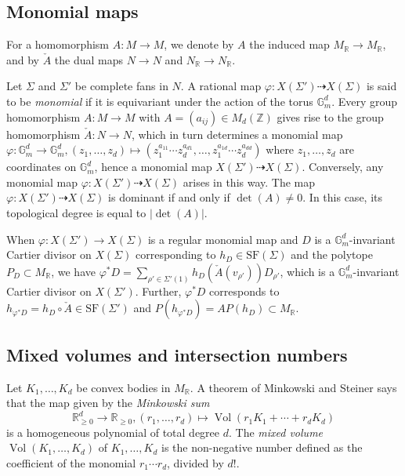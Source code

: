 \documentclass[11pt,a4paper]{article}
\theoremstyle{plain}
\theoremstyle{remark}
\theoremstyle{custombold}
\DeclareMathOperator{\vol}{Vol}
\begin{document}
\subsection{Monomial maps}

 For a homomorphism $A\colon M\rightarrow M$, we denote by $A$ the induced map $M_\mathbb R\rightarrow M_\mathbb R$, and by $\check{A}$ the dual maps $N\rightarrow N$ and $N_\mathbb R\rightarrow N_\mathbb R$.
 
Let $\Sigma$ and $\Sigma'$ be complete fans in $N$. A rational map $\varphi\colon X(\Sigma')\dashrightarrow X(\Sigma)$ is said to be  \emph{monomial} if it is equivariant under the action of the torus $\mathbb G_m^d$. Every group homomorphism $A\colon M\rightarrow M$ with $A=(a_{ij})\in M_d(\mathbb Z)$ gives rise to the group homomorphism $\check{A}\colon N\rightarrow N$, which in turn determines a monomial map
$\varphi\colon\mathbb G_m^d\rightarrow \mathbb G_m^d,(z_1,\ldots,z_d)\mapsto(z_1^{a_{11}}\cdots z_d^{a_{d1}},\ldots,z_1^{a_{1d}}\cdots z_d^{a_{dd}})$
where $z_1,\ldots,z_d$ are coordinates on $\mathbb G_m^d$, hence a monomial map $X(\Sigma')\dashrightarrow X(\Sigma)$. Conversely, any monomial map $\varphi\colon X(\Sigma')\dashrightarrow X(\Sigma)$ arises in this way. The map $\varphi\colon X(\Sigma')\dashrightarrow  X(\Sigma)$ is dominant if and only if  $\det(A)\neq0.$ In this case, its topological degree is equal to $|\det(A)|$. 

 
 When $\varphi\colon X(\Sigma') \rightarrow X(\Sigma)$ is a regular monomial map and $D$ is a $\mathbb G_m^d$-invariant Cartier divisor on $X(\Sigma)$ corresponding to $h_D\in \mathrm{SF}(\Sigma)$ and the polytope $P_D\subset M_\mathbb R$, we have $\varphi^*D=\sum_{\rho'\in\Sigma'(1)}h_D(\check{A}(v_{\rho'}))D_{\rho'}$, which is a $\mathbb G_m^d$-invariant Cartier divisor on $X(\Sigma')$. Further, $\varphi^*D$ corresponds to $h_{\varphi^*D}=h_D\circ \check{A}\in\mathrm{SF}(\Sigma')$ and $P(h_{\varphi^*D})=AP(h_D)\subset M_\mathbb R$.


\subsection{Mixed volumes and intersection numbers}


Let $K_1,\ldots,K_d$ be convex bodies in $M_\mathbb R$. A theorem of Minkowski and Steiner says that the map given by the \emph{Minkowski sum} $$\mathbb R^d_{\geq0}\rightarrow \mathbb R_{\geq0},(r_1,\ldots,r_d)\mapsto\vol(r_1K_1+\cdots+r_dK_d)$$is a homogeneous polynomial of total degree $d$. The \emph{mixed volume} $\vol(K_1,\ldots,K_d)$ of $K_1,\ldots,K_d$ is the non-negative number defined as the coefficient of the monomial $r_1\cdots r_d$, divided by $d!$. 
\end{document}
